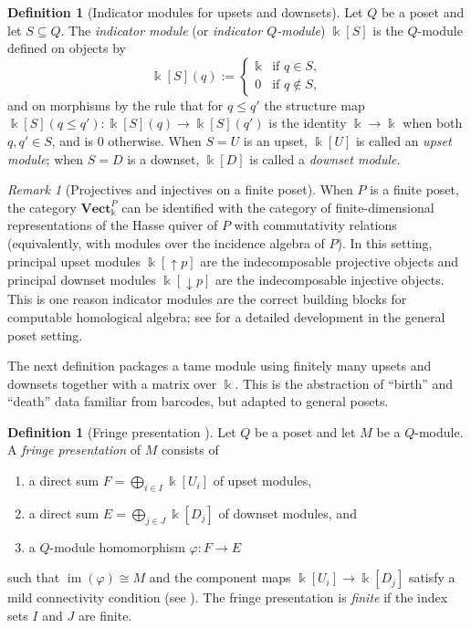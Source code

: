 \documentclass{article}
\newcommand{\kk}{\Bbbk}
\newcommand{\<}{\langle}
\renewcommand{\>}{\rangle}
\DeclareMathOperator{\im}{im}
\theoremstyle{definition}
\newtheorem{defn}[theorem]{Definition}
\theoremstyle{remark}
\newtheorem*{remark}{Remark}
\begin{document}
	\begin{defn}[Indicator modules for upsets and downsets]
		\label{def:indicator-modules}
		Let $Q$ be a poset and let $S\subseteq Q$.
		The \emph{indicator module} (or \emph{indicator $Q$-module}) $\kk[S]$ is the
		$Q$-module defined on objects by
		\[
		\kk[S](q) :=
		\begin{cases}
			\kk & \text{if } q\in S,\\
			0   & \text{if } q\notin S,
		\end{cases}
		\]
		and on morphisms by the rule that for $q\le q'$ the structure map
		$\kk[S](q\le q')\colon \kk[S](q)\to \kk[S](q')$ is the identity $\kk\to\kk$ when both
		$q,q'\in S$, and is $0$ otherwise.
		When $S=U$ is an upset, $\kk[U]$ is called an \emph{upset module}; when $S=D$ is a
		downset, $\kk[D]$ is called a \emph{downset module}.
	\end{defn}
	
	\begin{remark}[Projectives and injectives on a finite poset]
		\label{rem:proj-inj-finite-poset}
		When $P$ is a finite poset, the category $\mathbf{Vect}_{\kk}^{P}$ can be identified
		with the category of finite-dimensional representations of the Hasse quiver of $P$ with
		commutativity relations (equivalently, with modules over the incidence algebra of $P$).
		In this setting, principal upset modules $\kk[\uparrow p]$ are the indecomposable
		projective objects and principal downset modules $\kk[\downarrow p]$ are the
		indecomposable injective objects.  This is one reason indicator modules are the correct
		building blocks for computable homological algebra; see \cite{Mil20} for a detailed
		development in the general poset setting.
	\end{remark}
	
	The next definition packages a tame module using finitely many upsets and downsets
	together with a matrix over $\kk$.  This is the abstraction of ``birth'' and ``death''
	data familiar from barcodes, but adapted to general posets.
	
	\begin{defn}[Fringe presentation {\cite[Def.~3.16]{Mil20}}]
		\label{def:fringe-presentation}
		Let $Q$ be a poset and let $M$ be a $Q$-module.
		A \emph{fringe presentation} of $M$ consists of
		\begin{enumerate}[label=(\roman*)]
			\item a direct sum $F = \bigoplus_{i\in I}\kk[U_i]$ of upset modules,
			\item a direct sum $E = \bigoplus_{j\in J}\kk[D_j]$ of downset modules, and
			\item a $Q$-module homomorphism $\varphi\colon F\to E$
		\end{enumerate}
		such that $\im(\varphi)\cong M$ and the component maps
		$\kk[U_i]\to \kk[D_j]$ satisfy a mild connectivity condition (see \cite[Def.~3.14]{Mil20}).
		The fringe presentation is \emph{finite} if the index sets $I$ and $J$ are finite.
	\end{defn}
	
\end{document}
